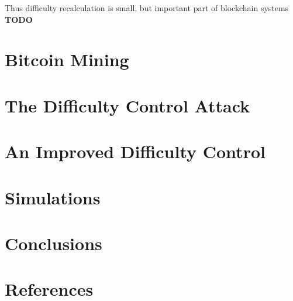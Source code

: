 \documentclass[number,preprint,review]{elsarticle}
\begin{document}
Thus difficulty recalculation is small, but important part of blockchain systems \textbf{TODO}

\section{Bitcoin Mining}


\section{The Difficulty Control Attack}


\section{An Improved Difficulty Control}

\section{Simulations}


\section{Conclusions}
\label{prot_improv}

\section*{References}



\end{document}
